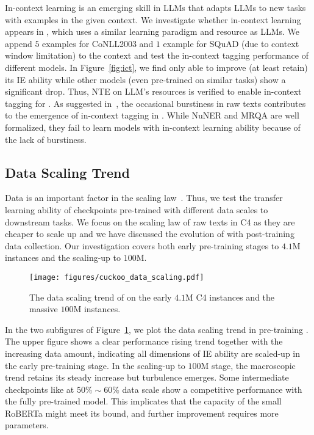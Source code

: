 In-context learning is an emerging skill in LLMs that adapts LLMs to new tasks with examples in the given context. We investigate whether in-context learning appears in \our, which uses a similar learning paradigm and resource as LLMs. We append $5$ examples for CoNLL2003 and $1$ example for SQuAD (due to context window limitation) to the context and test the in-context tagging performance of different models. In Figure~\ref{fig:ict}, we find only \our able to improve (at least retain) its IE ability while other models (even pre-trained on similar tasks) show a significant drop. Thus, NTE on LLM's resources is verified to enable in-context tagging for \our. As suggested in~\citet{emergence_of_icl}, the occasional burstiness in raw texts contributes to the emergence of in-context tagging in \our. While NuNER and MRQA are well formalized, they fail to learn models with in-context learning ability because of the lack of burstiness.

\subsection{Data Scaling Trend}

Data is an important factor in the scaling law~\citep{scaling_law}. Thus, we test the transfer learning ability of checkpoints pre-trained with different data scales to downstream tasks. We focus on the scaling law of raw texts in C4 as they are cheaper to scale up and we have discussed the evolution of \our with post-training data collection. Our investigation covers both early pre-training stages to $4.1$M instances and the scaling-up to $100$M.

\begin{figure}
    \centering
    \texttt{[image: figures/cuckoo\_data\_scaling.pdf]}
    \caption{The data scaling trend of \our on the early $4.1$M C4 instances and the massive $100$M instances.}
    \label{fig:scale}
\end{figure}

In the two subfigures of Figure~\ref{fig:scale}, we plot the data scaling trend in pre-training \our.  The upper figure shows a clear performance rising trend together with the increasing data amount, indicating all dimensions of IE ability are scaled-up in the early pre-training stage. In the scaling-up to $100$M stage, the macroscopic trend retains its steady increase but turbulence emerges. Some intermediate checkpoints like at $50\%\sim60\%$ data scale show a competitive performance with the fully pre-trained model. This implicates that the capacity of the small RoBERTa might meet its bound, and further improvement requires more parameters.